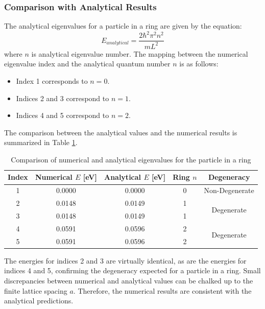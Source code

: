 \documentclass[a4paper, 10pt]{article}
\begin{document}
\subsubsection{Comparison with Analytical Results}
The analytical eigenvalues for a particle in a ring are given by the equation:
\begin{equation}
    E_{analytical} = \frac{2\hbar^2 \pi^2 n^2}{mL^2}
\end{equation}
where $n$ is analytical eigenvalue number. The mapping between the numerical eigenvalue index and the analytical quantum number $n$ is as follows:
\begin{itemize}
    \item Index 1 corresponds to $n=0$.
    \item Indices 2 and 3 correspond to $n=1$.
    \item Indices 4 and 5 correspond to $n=2$.
\end{itemize}

\noindent The comparison between the analytical values and the numerical results is summarized in Table \ref{tab:ring_energies}.

\begin{table}[H]
    \centering
    \caption{Comparison of numerical and analytical eigenvalues for the particle in a ring}
    \label{tab:ring_energies}
    \renewcommand{\arraystretch}{1.2}
    \begin{tabular}{|c|c|c|c|c|}
        \hline
        \textbf{Index} & \textbf{Numerical $E$ [eV]} & \textbf{Analytical $E$ [eV]} & \textbf{Ring $n$} & \textbf{Degeneracy} \\
        \hline
        1 & 0.0000 & 0.0000 & 0 & Non-Degenerate \\
        \hline
        2 & 0.0148 & 0.0149 & 1 & \multirow{2}{*}{Degenerate} \\
        3 & 0.0148 & 0.0149 & 1 & \\
        \hline
        4 & 0.0591 & 0.0596 & 2 & \multirow{2}{*}{Degenerate} \\
        5 & 0.0591 & 0.0596 & 2 & \\
        \hline
    \end{tabular}
\end{table}

\noindent The energies for indices 2 and 3 are virtually identical, as are the energies for indices 4 and 5, confirming the degeneracy expected for a particle in a ring. Small discrepancies between numerical and analytical values can be chalked up to the finite lattice spacing $a$. Therefore, the numerical results are consistent with the analytical predictions.
\end{document}
